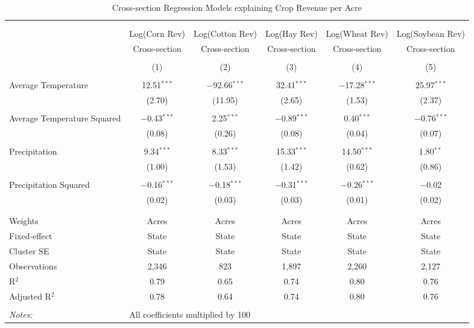 \documentclass[10pt]{article}
\begin{document}
\begin{table}[!htbp] \centering 
  \caption{Cross-section Regression Models explaining Crop Revenue per Acre} 
  \label{} 
\footnotesize 
\begin{tabular}{@{\extracolsep{5pt}}lccccc} 
\\[-1.8ex]\hline 
\hline \\[-1.8ex] 
\\[-1.8ex] & Log(Corn Rev) & Log(Cotton Rev) & Log(Hay Rev) & Log(Wheat Rev) & Log(Soybean Rev) \\ 
 & Cross-section & Cross-section & Cross-section & Cross-section & Cross-section \\ 
\\[-1.8ex] & (1) & (2) & (3) & (4) & (5)\\ 
\hline \\[-1.8ex] 
 Average Temperature & 12.51$^{***}$ & $-$92.66$^{***}$ & 32.41$^{***}$ & $-$17.28$^{***}$ & 25.97$^{***}$ \\ 
  & (2.70) & (11.95) & (2.65) & (1.53) & (2.37) \\ 
  & & & & & \\ 
 Average Temperature Squared & $-$0.43$^{***}$ & 2.25$^{***}$ & $-$0.89$^{***}$ & 0.40$^{***}$ & $-$0.76$^{***}$ \\ 
  & (0.08) & (0.26) & (0.08) & (0.04) & (0.07) \\ 
  & & & & & \\ 
 Precipitation & 9.34$^{***}$ & 8.33$^{***}$ & 15.33$^{***}$ & 14.50$^{***}$ & 1.80$^{**}$ \\ 
  & (1.00) & (1.53) & (1.42) & (0.62) & (0.86) \\ 
  & & & & & \\ 
 Precipitation Squared & $-$0.16$^{***}$ & $-$0.18$^{***}$ & $-$0.31$^{***}$ & $-$0.26$^{***}$ & $-$0.02 \\ 
  & (0.02) & (0.03) & (0.03) & (0.01) & (0.02) \\ 
  & & & & & \\ 
\hline \\[-1.8ex] 
Weights & Acres & Acres & Acres & Acres & Acres \\ 
Fixed-effect & State & State & State & State & State \\ 
Cluster SE & State & State & State & State & State \\ 
Observations & 2,346 & 823 & 1,897 & 2,260 & 2,127 \\ 
R$^{2}$ & 0.79 & 0.65 & 0.74 & 0.80 & 0.76 \\ 
Adjusted R$^{2}$ & 0.78 & 0.64 & 0.74 & 0.80 & 0.76 \\ 
\hline 
\hline \\[-1.8ex] 
\textit{Notes:} & \multicolumn{5}{l}{All coefficients multiplied by 100} \\ 
\end{tabular} 
\end{table} 
\end{document}
